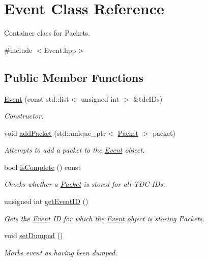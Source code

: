 \hypertarget{class_event}{}\section{Event Class Reference}
\label{class_event}


Container class for Packets.  




{\ttfamily \#include $<$Event.\+hpp$>$}

\subsection*{Public Member Functions}
\begin{DoxyCompactItemize}
\item 
\hyperlink{class_event_a6e0319cd5e7b0e8b232e3c829c2ad00c}{Event} (const std\+::list$<$ unsigned int $>$ \&tdc\+I\+Ds)
\begin{DoxyCompactList}\small\item\em Constructor. \end{DoxyCompactList}\item 
void \hyperlink{class_event_a08c4689086126f702d3b14be99461c98}{add\+Packet} (std\+::unique\+\_\+ptr$<$ \hyperlink{class_packet}{Packet} $>$ packet)
\begin{DoxyCompactList}\small\item\em Attempts to add a packet to the \hyperlink{class_event}{Event} object. \end{DoxyCompactList}\item 
bool \hyperlink{class_event_a2a00b2c0c579397ac93c834cf987cbd9}{is\+Complete} () const
\begin{DoxyCompactList}\small\item\em Checks whether a \hyperlink{class_packet}{Packet} is stored for all T\+DC I\+Ds. \end{DoxyCompactList}\item 
unsigned int \hyperlink{class_event_a3f48bec589c70aa0d36fd5cb253ad88c}{get\+Event\+ID} ()
\begin{DoxyCompactList}\small\item\em Gets the \hyperlink{class_event}{Event} ID for which the \hyperlink{class_event}{Event} object is storing Packets. \end{DoxyCompactList}\item 
void \hyperlink{class_event_ae0c56d36ba53360683e0917e4caac6ed}{set\+Dumped} ()
\begin{DoxyCompactList}\small\item\em Marks event as having been dumped. \end{DoxyCompactList}\item 

\end{DoxyCompactItemize}

